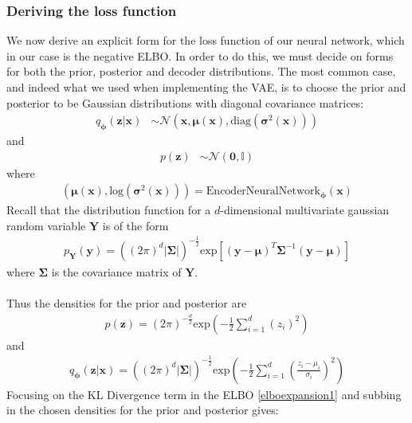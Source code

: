 \documentclass{article}
\theoremstyle{definition}
\begin{document}
\subsubsection{Deriving the loss function}
We now derive an explicit form for the loss function of our neural network, which in our case is the negative ELBO. In order to do this, we must decide on forms for both the prior, posterior and decoder distributions. 
The most common case, and indeed what we used when implementing the VAE, is to choose the prior and posterior to be Gaussian distributions with diagonal covariance matrices:
\begin{align}
q_{\boldsymbol{\phi}}(\mathbf{z}|\mathbf{x}) &\sim \mathcal{N}\left(\mathbf{x}, \boldsymbol{\mu}(\mathbf{x}), \text{diag}\left(\boldsymbol{\sigma}^{2}(\mathbf{x})\right)\right)
\end{align}
and
\begin{align}
p(\mathbf{z}) &\sim \mathcal{N}(\mathbf{0}, \mathbb{I})
\end{align}
where
\begin{align}
    \left(\boldsymbol{\mu}(\mathbf{x}), \text{log}\left(\boldsymbol{\sigma}^{2}(\mathbf{x})\right)\right) = \text{EncoderNeuralNetwork}_{\boldsymbol{\phi}}(\mathbf{x})
\end{align}
Recall that the distribution function for a $d$-dimensional multivariate gaussian random variable $\mathbf{Y}$ is of the form 
\begin{align}
    p_\mathbf{Y}(\mathbf{y})=\left((2\pi)^{d}|\boldsymbol{\Sigma}|\right)^{-\frac{1}{2}} \text{exp}\left[(\mathbf{y}-\boldsymbol{\mu})^{T}\boldsymbol{\Sigma}^{-1}(\mathbf{y}-\boldsymbol{\mu})\right]
\end{align}
where $\boldsymbol{\Sigma}$ is the covariance matrix of $\mathbf{Y}$.\\\\
Thus the densities for the prior and posterior are 
\begin{align}
    p(\textbf{z}) = (2\pi)^{-\frac{d}{2}}\text{exp}\left(-\frac{1}{2}\sum_{i=1}^{d} (z_{i})^2\right)
\end{align}
and 
\begin{align}
    q_{\boldsymbol{\phi}}(\mathbf{z}|\mathbf{x})=\left((2\pi)^{d}|\boldsymbol{\Sigma}|\right)^{-\frac{1}{2}}\text{exp}\left(-\frac{1}{2}\sum_{i=1}^{d}\left(\frac{z_i-\mu_i}{\sigma_i}\right)^2\right)
\end{align}
Focusing on the KL Divergence term in the ELBO \ref{elboexpansion1} and subbing in the chosen densities for the prior and posterior gives:
\end{document}
